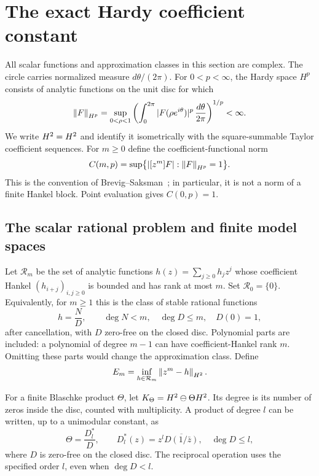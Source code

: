 \section{The exact Hardy coefficient constant}
\label{I:B:sec:hardy}

All scalar functions and approximation classes in this section are complex.
The circle carries normalized measure $d\theta/(2\pi)$.  For $0<p<\infty$,
the Hardy space $H^p$ consists of analytic functions on the unit disc for which
\[
 \left\lVert F\right\rVert_{H^p}
 =\sup_{0<\rho<1}\left(\int_0^{2\pi}
       |F(\rho e^{i\theta})|^p\,\frac{d\theta}{2\pi}\right)^{1/p}<\infty.
\]
We write $H^2=H^2$ and identify it isometrically with the square-summable
Taylor coefficient sequences.  For $m\ge0$ define the coefficient-functional
norm
\begin{equation}
 C(m,p)=\sup\bigl\{|[z^m]F|:\left\lVert F\right\rVert_{H^p}=1\bigr\}.
 \label{I:B:eq:hardy-C-definition}
\end{equation}
This is the convention of Brevig--Saksman~\cite{brevig2020}; in particular,
it is not a norm of a finite Hankel block.  Point evaluation gives $C(0,p)=1$.

\subsection{The scalar rational problem and finite model spaces}

Let $\mathcal R_m$ be the set of analytic functions $h(z)=\sum_{j\ge0}h_jz^j$
whose coefficient Hankel $(h_{i+j})_{i,j\ge0}$ is bounded and has rank at most
$m$.  Set $\mathcal R_0=\{0\}$.  Equivalently, for $m\ge1$ this is the class
of stable rational functions
\begin{equation}
 h=\frac{N}{D},\qquad \deg N<m,\quad \deg D\le m,\quad D(0)=1,
 \label{I:B:eq:hardy-rational-class}
\end{equation}
after cancellation, with $D$ zero-free on the closed disc.  Polynomial parts
are included: a polynomial of degree $m-1$ can have coefficient-Hankel rank
$m$.  Omitting these parts would change the approximation class.  Define
\begin{equation}
 E_m=\inf_{h\in\mathcal R_m}\left\lVert z^m-h\right\rVert_{H^2}.
 \label{I:B:eq:hardy-E-definition}
\end{equation}

For a finite Blaschke product $\Theta$, let
$K_\Theta=H^2\ominus\Theta H^2$.  Its degree is its number of zeros
inside the disc, counted with multiplicity.  A product of degree $l$ can be
written, up to a unimodular constant, as
\[
 \Theta=\frac{D_l^*}{D},\qquad
 D_l^*(z)=z^l\overline{D(1/\bar z)},\quad \deg D\le l,
\]
where $D$ is zero-free on the closed disc.  The reciprocal operation uses
the specified order $l$, even when $\deg D<l$.

